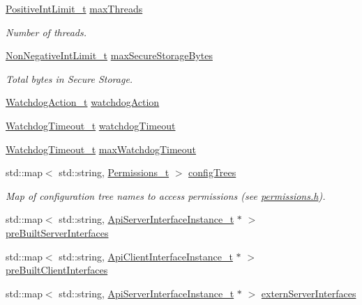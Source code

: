 \begin{DoxyCompactItemize}
\hyperlink{struct_positive_int_limit__t}{Positive\+Int\+Limit\+\_\+t} \hyperlink{struct_app__t_a76ee0a3f3570f14447e4f68a94fd0e9f}{max\+Threads}
\begin{DoxyCompactList}\small\item\em Number of threads. \end{DoxyCompactList}\item 
\hyperlink{class_non_negative_int_limit__t}{Non\+Negative\+Int\+Limit\+\_\+t} \hyperlink{struct_app__t_ae2bc9773d6262d29bc7c7ac4c233ff46}{max\+Secure\+Storage\+Bytes}
\begin{DoxyCompactList}\small\item\em Total bytes in Secure Storage. \end{DoxyCompactList}\item 
\hyperlink{class_watchdog_action__t}{Watchdog\+Action\+\_\+t} \hyperlink{struct_app__t_a9c69931eaf806dddb9878e8cbc8c3e37}{watchdog\+Action}
\item 
\hyperlink{class_watchdog_timeout__t}{Watchdog\+Timeout\+\_\+t} \hyperlink{struct_app__t_a3b6e1b614e852120774e67fbc4a13197}{watchdog\+Timeout}
\item 
\hyperlink{class_watchdog_timeout__t}{Watchdog\+Timeout\+\_\+t} \hyperlink{struct_app__t_ae7e819b81e7412e4b34afa3ec466edd1}{max\+Watchdog\+Timeout}
\item 
std\+::map$<$ std\+::string, \hyperlink{struct_permissions__t}{Permissions\+\_\+t} $>$ \hyperlink{struct_app__t_a4820d5f23eee5a900fc3a656353b8bdb}{config\+Trees}
\begin{DoxyCompactList}\small\item\em Map of configuration tree names to access permissions (see \hyperlink{permissions_8h}{permissions.\+h}). \end{DoxyCompactList}\item 
std\+::map$<$ std\+::string, \hyperlink{struct_api_server_interface_instance__t}{Api\+Server\+Interface\+Instance\+\_\+t} $\ast$ $>$ \hyperlink{struct_app__t_a0323e0de984089357e9b7815d6a973e2}{pre\+Built\+Server\+Interfaces}
\item 
std\+::map$<$ std\+::string, \hyperlink{struct_api_client_interface_instance__t}{Api\+Client\+Interface\+Instance\+\_\+t} $\ast$ $>$ \hyperlink{struct_app__t_a6579c151e9b59a943d48b5b6635a5af0}{pre\+Built\+Client\+Interfaces}
\item 
std\+::map$<$ std\+::string, \hyperlink{struct_api_server_interface_instance__t}{Api\+Server\+Interface\+Instance\+\_\+t} $\ast$ $>$ \hyperlink{struct_app__t_a5e53d548e39c87b357bfc917b752720c}{extern\+Server\+Interfaces}

\end{DoxyCompactItemize}
